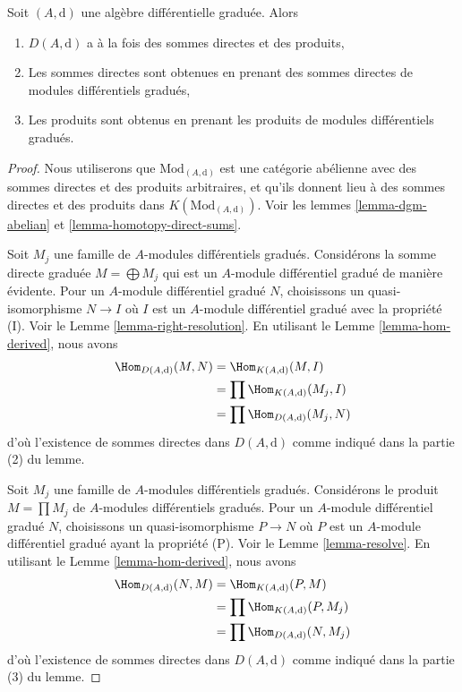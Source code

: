 \begin{lemma}
\label{lemma-derived-products}
Soit $(A, \text{d})$ une algèbre différentielle graduée. Alors
\begin{enumerate}
\item $D(A, \text{d})$ a à la fois des sommes directes et des produits,
\item Les sommes directes sont obtenues en prenant des sommes directes de modules
différentiels gradués,
\item Les produits sont obtenus en prenant les produits de modules différentiels
gradués.
\end{enumerate}
\end{lemma}

\begin{proof}
Nous utiliserons que $\text{Mod}_{(A, \text{d})}$ est une catégorie abélienne avec
des sommes directes et des produits arbitraires, et qu'ils donnent lieu à des
sommes directes et des produits dans $K(\text{Mod}_{(A, \text{d})})$. Voir les
lemmes \ref{lemma-dgm-abelian} et \ref{lemma-homotopy-direct-sums}.

\medskip\noindent
Soit $M_j$ une famille de $A$-modules différentiels gradués. Considérons la somme
directe graduée $M = \bigoplus M_j$ qui est un $A$-module différentiel gradué de
manière évidente. Pour un $A$-module différentiel gradué $N$, choisissons un
quasi-isomorphisme $N \to I$ où $I$ est un $A$-module différentiel gradué avec la
propriété (I). Voir le Lemme \ref{lemma-right-resolution}. En utilisant le Lemme
\ref{lemma-hom-derived}, nous avons
\begin{align*}
\Hom_{D(A, \text{d})}(M, N)
& =
\Hom_{K(A, \text{d})}(M, I) \\
& =
\prod \Hom_{K(A, \text{d})}(M_j, I) \\
& =
\prod \Hom_{D(A, \text{d})}(M_j, N)
\end{align*}
d'où l'existence de sommes directes dans $D(A, \text{d})$ comme indiqué dans la
partie (2) du lemme.

\medskip\noindent
Soit $M_j$ une famille de $A$-modules différentiels gradués. Considérons le
produit $M = \prod M_j$ de $A$-modules différentiels gradués. Pour un $A$-module
différentiel gradué $N$, choisissons un quasi-isomorphisme $P \to N$ où $P$ est un
$A$-module différentiel gradué ayant la propriété (P). Voir le Lemme
\ref{lemma-resolve}. En utilisant le Lemme \ref{lemma-hom-derived}, nous avons
\begin{align*}
\Hom_{D(A, \text{d})}(N, M)
& =
\Hom_{K(A, \text{d})}(P, M) \\
& =
\prod \Hom_{K(A, \text{d})}(P, M_j) \\
& =
\prod \Hom_{D(A, \text{d})}(N, M_j)
\end{align*}
d'où l'existence de sommes directes dans $D(A, \text{d})$ comme indiqué dans la
partie (3) du lemme.
\end{proof}

